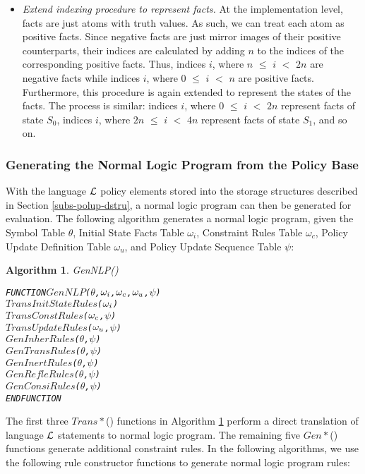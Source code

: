\documentclass[11pt]{report}
\newenvironment{vverbatim}
{
  \begin{alltt}
}
{
    \vspace{-\baselineskip}
  \end{alltt}
}
\newtheorem{vvalgorithm}{Algorithm}[chapter]
\newenvironment{valgorithm}[2]
{
  \begin{vvalgorithm}{#1}
    \label{#2}
    \small
    \begin{vverbatim}
}
{
    \end{vverbatim}
  \end{vvalgorithm}
}
\begin{document}
\begin{itemize}
            \item
              {\em Extend indexing procedure to represent facts.} At the
              implementation level, facts are just atoms with truth values.
              As such, we can treat each atom as positive facts. Since negative
              facts are just mirror images of their positive counterparts,
              their indices are calculated by adding $n$ to the indices of the
              corresponding positive facts. Thus, indices $i$, where $n$ $\leq$
              $i$ $<$ $2n$ are negative facts while indices $i$, where $0$
              $\leq$ $i$ $<$ $n$ are positive facts. Furthermore, this
              procedure is again extended to represent the states of the
              facts. The process is similar: indices $i$, where $0$ $\leq$ $i$
              $<$ $2n$ represent facts of state $S_{0}$, indices $i$, where
              $2n$ $\leq$ $i$ $<$ $4n$ represent facts of state $S_{1}$, and
              so on.
          \end{itemize}

        \subsubsection{Generating the Normal Logic Program from the Policy Base}

          With the language ${\cal L}$ policy elements stored into the storage
          structures described in Section \ref{subs-polup-dstru}, a normal
          logic program can then be generated for evaluation. The following
          algorithm generates a normal logic program, given the Symbol Table
          $\theta$, Initial State Facts Table $\omega_i$, Constraint Rules
          Table $\omega_c$, Policy Update Definition Table $\omega_u$, and
          Policy Update Sequence Table $\psi$:

          \begin{valgorithm}{GenNLP()}{algo-polup-genlp}
FUNCTION \(GenNLP\)(\(\theta\), \(\omega\sb{i}\), \(\omega\sb{c}\), \(\omega\sb{u}\), \(\psi\))
  \(TransInitStateRules\)(\(\omega\sb{i}\))
  \(TransConstRules\)(\(\omega\sb{c}\), \(\psi\))
  \(TransUpdateRules\)(\(\omega\sb{u}\), \(\psi\))
  \(GenInherRules\)(\(\theta\), \(\psi\))
  \(GenTransRules\)(\(\theta\), \(\psi\))
  \(GenInertRules\)(\(\theta\), \(\psi\))
  \(GenRefleRules\)(\(\theta\), \(\psi\))
  \(GenConsiRules\)(\(\theta\), \(\psi\))
ENDFUNCTION
          \end{valgorithm}

          The first three $Trans*$() functions in Algorithm
          \ref{algo-polup-genlp} perform a direct translation of language
          ${\cal L}$ statements to normal logic program. The remaining five
          $Gen*$() functions generate additional constraint rules. In the
          following algorithms, we use the following rule constructor functions
          to generate normal logic program rules:
\end{document}
